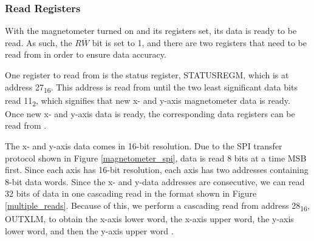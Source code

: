 \subsubsection{Read Registers}
With the magnetometer turned on and its registers set, its data is ready to be read. As such, the $R\overline{W}$ bit is set to 1, and there are two registers that need to be read from in order to ensure data accuracy. 
\par
One register to read from is the status register, STATUS\textunderscore{}REG\textunderscore{}M, which is at address 27\textsubscript{16}. This address is read from until the two least significant data bits read 11\textsubscript{2}, which signifies that new x- and y-axis magnetometer data is ready. Once new x- and y-axis data is ready, the corresponding data registers can be read from \cite{lsm9ds1}.
\par
The x- and y-axis data comes in 16-bit resolution. Due to the SPI transfer protocol shown in Figure \ref{magnetometer_spi}, data is read 8 bits at a time MSB first. Since each axis has 16-bit resolution, each axis has two addresses containing 8-bit data words. Since the x- and y-data addresses are consecutive, we can read 32 bits of data in one cascading read in the format shown in Figure \ref{multiple_reads}. Because of this, we perform a cascading read from address 28\textsubscript{16}, OUT\textunderscore{}X\textunderscore{}L\textunderscore{}M, to obtain the x-axis lower word, the x-axis upper word, the y-axis lower word, and then the y-axis upper word \cite{lsm9ds1}.







